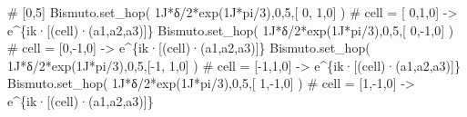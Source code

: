 \documentclass[
  letterpaper,
  DIV=11,
  numbers=noendperiod]{scrreprt}
\newenvironment{Shaded}{\begin{snugshade}}{\end{snugshade}}
\newcommand{\CommentTok}[1]{\textcolor[rgb]{0.37,0.37,0.37}{#1}}
\newcommand{\DecValTok}[1]{\textcolor[rgb]{0.68,0.00,0.00}{#1}}
\newcommand{\NormalTok}[1]{\textcolor[rgb]{0.00,0.23,0.31}{#1}}
\newcommand{\OperatorTok}[1]{\textcolor[rgb]{0.37,0.37,0.37}{#1}}
\newcommand{\OtherTok}[1]{\textcolor[rgb]{0.00,0.23,0.31}{#1}}
\begin{document}
\begin{Shaded}
\begin{Highlighting}[]
\CommentTok{\# [0,5]}
\NormalTok{Bismuto.set\_hop(  }\OtherTok{1J}\OperatorTok{*}\NormalTok{δ}\OperatorTok{/}\DecValTok{2}\OperatorTok{*}\NormalTok{exp(}\OtherTok{1J}\OperatorTok{*}\NormalTok{pi}\OperatorTok{/}\DecValTok{3}\NormalTok{),}\DecValTok{0}\NormalTok{,}\DecValTok{5}\NormalTok{,[ }\DecValTok{0}\NormalTok{, }\DecValTok{1}\NormalTok{,}\DecValTok{0}\NormalTok{] ) }\CommentTok{\# cell = [ 0,1,0] {-}\textgreater{} e\^{}\{ik·[(cell)·(a1,a2,a3)]\}}
\NormalTok{Bismuto.set\_hop(  }\OtherTok{1J}\OperatorTok{*}\NormalTok{δ}\OperatorTok{/}\DecValTok{2}\OperatorTok{*}\NormalTok{exp(}\OtherTok{1J}\OperatorTok{*}\NormalTok{pi}\OperatorTok{/}\DecValTok{3}\NormalTok{),}\DecValTok{0}\NormalTok{,}\DecValTok{5}\NormalTok{,[ }\DecValTok{0}\NormalTok{,}\OperatorTok{{-}}\DecValTok{1}\NormalTok{,}\DecValTok{0}\NormalTok{] ) }\CommentTok{\# cell = [0,{-}1,0] {-}\textgreater{} e\^{}\{ik·[(cell)·(a1,a2,a3)]\}}
\NormalTok{Bismuto.set\_hop(  }\OtherTok{1J}\OperatorTok{*}\NormalTok{δ}\OperatorTok{/}\DecValTok{2}\OperatorTok{*}\NormalTok{exp(}\OtherTok{1J}\OperatorTok{*}\NormalTok{pi}\OperatorTok{/}\DecValTok{3}\NormalTok{),}\DecValTok{0}\NormalTok{,}\DecValTok{5}\NormalTok{,[}\OperatorTok{{-}}\DecValTok{1}\NormalTok{, }\DecValTok{1}\NormalTok{,}\DecValTok{0}\NormalTok{] ) }\CommentTok{\# cell = [{-}1,1,0] {-}\textgreater{} e\^{}\{ik·[(cell)·(a1,a2,a3)]\}}
\NormalTok{Bismuto.set\_hop(  }\OtherTok{1J}\OperatorTok{*}\NormalTok{δ}\OperatorTok{/}\DecValTok{2}\OperatorTok{*}\NormalTok{exp(}\OtherTok{1J}\OperatorTok{*}\NormalTok{pi}\OperatorTok{/}\DecValTok{3}\NormalTok{),}\DecValTok{0}\NormalTok{,}\DecValTok{5}\NormalTok{,[ }\DecValTok{1}\NormalTok{,}\OperatorTok{{-}}\DecValTok{1}\NormalTok{,}\DecValTok{0}\NormalTok{] ) }\CommentTok{\# cell = [1,{-}1,0] {-}\textgreater{} e\^{}\{ik·[(cell)·(a1,a2,a3)]\}}


\end{Highlighting}
\end{Shaded}
\end{document}
